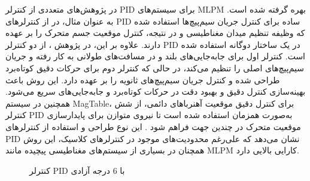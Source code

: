 در پژوهش‌های متعددی از کنترلر PID برای سیستم‌های MLPM بهره گرفته شده است. به عنوان مثال، در 
\cite{RN39,RN24}
از کنترلرهای PID ساده برای کنترل جریان سیم‌پیچ‌ها استفاده شده که وظیفه تنظیم میدان مغناطیسی و در نتیجه، کنترل موقعیت جسم متحرک را بر عهده دارند. علاوه بر این، در پژوهش
\cite{RN32}
، از دو کنترلر PID در یک ساختار دوگانه استفاده شده است. کنترلر اول برای جابه‌جایی‌های بلند و در مسافت‌های طولانی به کار رفته و جریان سیم‌پیچ‌های اصلی را تنظیم می‌کند، در حالی که کنترلر دوم برای حرکات دقیق کوتاه‌برد طراحی شده و کنترل جریان سیم‌پیچ‌های ثانویه را بر عهده دارد. این روش باعث بهینه‌سازی کنترل دقیق و بهبود دقت در حرکات کوتاه‌برد و جابه‌جایی‌های سریع می‌شود.
همچنین در سیستم MagTable، برای کنترل دقیق موقعیت آهنرباهای دائمی، از شش کنترلر PID به‌صورت همزمان استفاده شده است تا نیروی متوازن برای پایدارسازی موقعیت متحرک در چندین جهت فراهم شود 
\cite{RN8}
. این نوع طراحی و استفاده از کنترلرهای PID نشان می‌دهد که علی‌رغم محدودیت‌های موجود در کنترلرهای کلاسیک، این روش همچنان در بسیاری از سیستم‌های مغناطیسی پیچیده مانند MLPM کارایی بالایی دارد.

\begin{figure}[ht]
	\caption{کنترلر PID با 6 درجه آزادی
		\cite{RN8}}
	\label{fig:PID}
\end{figure}



